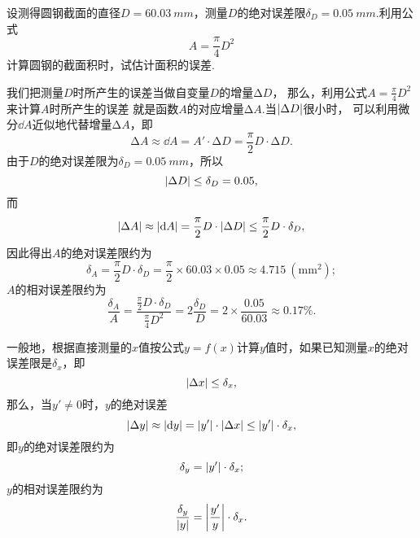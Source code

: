 \begin{example}
设测得圆钢截面的直径\(D = 60.03\ mm\)，测量\(D\)的绝对误差限\(\delta_D = 0.05\ mm\).利用公式\begin{equation*}
A = \frac{\pi}{4} D^2
\end{equation*}计算圆钢的截面积时，试估计面积的误差.
\begin{solution}
我们把测量\(D\)时所产生的误差当做自变量\(D\)的增量\(\increment D\)，
那么，利用公式\(A = \frac{\pi}{4} D^2\)来计算\(A\)时所产生的误差
就是函数\(A\)的对应增量\(\increment A\).当\(\abs{\Delta D}\)很小时，
可以利用微分\(\dd{A}\)近似地代替增量\(\increment A\)，即\begin{equation*}
\increment A \approx \dd{A} = A' \cdot \increment D = \frac{\pi}{2} D \cdot \increment D.
\end{equation*}由于\(D\)的绝对误差限为\(\delta_D = 0.05\ mm\)，所以\begin{equation*}
\abs{\Delta D} \leq \delta_D = 0.05,
\end{equation*}而\begin{equation*}
\abs{\Delta A} \approx \abs{\dd{A}} = \frac{\pi}{2} D \cdot \abs{\Delta D} \leq \frac{\pi}{2} D \cdot \delta_D,
\end{equation*}因此得出\(A\)的绝对误差限约为\begin{equation*}
\delta_A = \frac{\pi}{2} D \cdot \delta_D = \frac{\pi}{2} \times 60.03 \times 0.05 \approx 4.715\ (\mathrm{mm}^2);
\end{equation*}\(A\)的相对误差限约为\begin{equation*}
\frac{\delta_A}{A} = \frac{\frac{\pi}{2} D \cdot \delta_D}{\frac{\pi}{4} D^2}
= 2 \frac{\delta_D}{D} = 2 \times \frac{0.05}{60.03} \approx 0.17\%.
\end{equation*}
\end{solution}
\end{example}

一般地，根据直接测量的\(x\)值按公式\(y = f(x)\)计算\(y\)值时，如果已知测量\(x\)的绝对误差限是\(\delta_x\)，即\begin{equation*}
\abs{\Delta x} \leq \delta_x,
\end{equation*}那么，当\(y' \neq 0\)时，\(y\)的绝对误差\begin{equation*}
\abs{\Delta y} \approx \abs{\dd{y}} = \abs{y'} \cdot \abs{\Delta x} \leq \abs{y'} \cdot \delta_x,
\end{equation*}即\(y\)的绝对误差限约为\begin{equation*}
\delta_y = \abs{y'} \cdot \delta_x;
\end{equation*}\(y\)的相对误差限约为\begin{equation*}
\frac{\delta_y}{\abs{y}} = \abs{\frac{y'}{y}} \cdot \delta_x.
\end{equation*}
